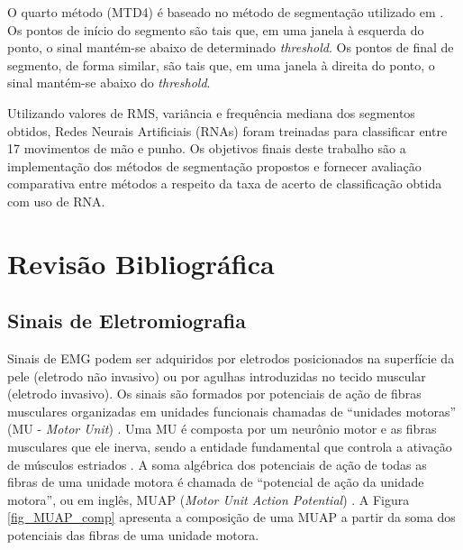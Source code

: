 O quarto método (MTD4) é baseado no método de segmentação utilizado em \cite{Pattichis1995}. Os pontos de início do segmento são tais que, em uma janela à esquerda do ponto, o sinal mantém-se abaixo de determinado \emph{threshold}. Os pontos de final de segmento, de forma similar, são tais que, em uma janela à direita do ponto, o sinal mantém-se abaixo do \emph{threshold}.

Utilizando valores de RMS, variância e frequência mediana dos segmentos obtidos, Redes Neurais Artificiais (RNAs) foram treinadas para classificar entre 17 movimentos de mão e punho. Os objetivos finais deste trabalho são a implementação dos métodos de segmentação propostos e fornecer avaliação comparativa entre métodos a respeito da taxa de acerto de classificação obtida com uso de RNA.

	\chapter{Revisão Bibliográfica}
		\section{Sinais de Eletromiografia}
Sinais de EMG podem ser adquiridos por eletrodos posicionados na superfície da pele (eletrodo não invasivo) ou por agulhas introduzidas no tecido muscular (eletrodo invasivo). Os sinais são formados por potenciais de ação de fibras musculares organizadas em unidades funcionais chamadas de ``unidades motoras'' (MU - \emph{Motor Unit}) \cite{Luca2006}. Uma MU é composta por um neurônio motor e as fibras musculares que ele inerva, sendo a entidade fundamental que controla a ativação de músculos estriados \cite{Buchthal980}. A soma algébrica dos potenciais de ação de todas as fibras de uma unidade motora é chamada de ``potencial de ação da unidade motora'', ou em inglês, MUAP (\emph{Motor Unit Action Potential}) \cite{Almeida1997}. A Figura \ref{fig_MUAP_comp} apresenta a composição de uma MUAP a partir da soma dos potenciais das fibras de uma unidade motora.

